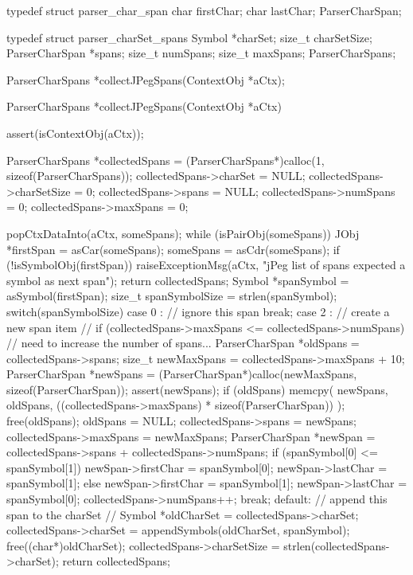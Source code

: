 \startCHeader
typedef struct parser_char_span {
  char firstChar;
  char lastChar;
} ParserCharSpan;

typedef struct parser_charSet_spans {
  Symbol         *charSet;
  size_t          charSetSize;
  ParserCharSpan *spans;
  size_t          numSpans;
  size_t          maxSpans;
} ParserCharSpans;

ParserCharSpans *collectJPegSpans(ContextObj *aCtx);
\stopCHeader

\startCCode
ParserCharSpans *collectJPegSpans(ContextObj *aCtx) {
  assert(isContextObj(aCtx));
  
  ParserCharSpans *collectedSpans = 
    (ParserCharSpans*)calloc(1, sizeof(ParserCharSpans));
  collectedSpans->charSet     = NULL;
  collectedSpans->charSetSize = 0;
  collectedSpans->spans       = NULL;
  collectedSpans->numSpans    = 0;
  collectedSpans->maxSpans    = 0;
  
  popCtxDataInto(aCtx, someSpans);
  while (isPairObj(someSpans)) {
    JObj *firstSpan = asCar(someSpans);
    someSpans       = asCdr(someSpans);
    if (!isSymbolObj(firstSpan)) {
      raiseExceptionMsg(aCtx,
        "jPeg list of spans expected a symbol as next span");
      return collectedSpans; 
    }
    Symbol *spanSymbol     = asSymbol(firstSpan);
    size_t  spanSymbolSize = strlen(spanSymbol);
    switch(spanSymbolSize) {
      case 0 :
        // ignore this span
        break;
      case 2 :
        // create a new span item
        //
        if (collectedSpans->maxSpans <= collectedSpans->numSpans) {
          // need to increase the number of spans...
          ParserCharSpan *oldSpans = collectedSpans->spans;
          size_t newMaxSpans       = collectedSpans->maxSpans + 10;
          ParserCharSpan *newSpans =
            (ParserCharSpan*)calloc(newMaxSpans, sizeof(ParserCharSpan));
          assert(newSpans);
          if (oldSpans) {
            memcpy(
              newSpans,
              oldSpans,
              ((collectedSpans->maxSpans) * sizeof(ParserCharSpan))
            );
            free(oldSpans);
            oldSpans = NULL;
          }
          collectedSpans->spans    = newSpans;
          collectedSpans->maxSpans = newMaxSpans;
        }
        ParserCharSpan *newSpan =
          collectedSpans->spans + collectedSpans->numSpans;
        if (spanSymbol[0] <= spanSymbol[1]) {
          newSpan->firstChar = spanSymbol[0];
          newSpan->lastChar  = spanSymbol[1];
        } else {
          newSpan->firstChar = spanSymbol[1];
          newSpan->lastChar  = spanSymbol[0];
        }
        collectedSpans->numSpans++;
        break;
      default: {
        // append this span to the charSet
        //
        Symbol *oldCharSet = collectedSpans->charSet;
        collectedSpans->charSet =
          appendSymbols(oldCharSet, spanSymbol);
        free((char*)oldCharSet);
        collectedSpans->charSetSize = strlen(collectedSpans->charSet);
      }
    }
  }
  return collectedSpans;
}
\stopCCode

